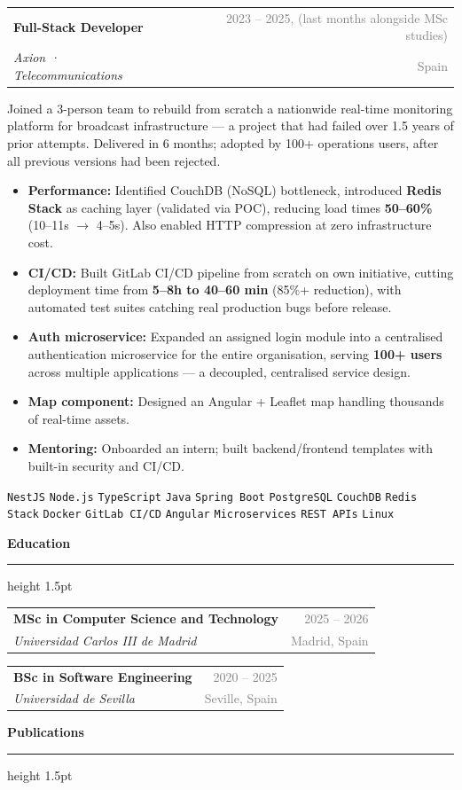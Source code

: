 \documentclass[9.5pt, a4paper]{article}
\newcommand{\cvsection}[1]{%
    \vspace{0.2cm}
    {\large \textbf{\textcolor{primary}{#1}}}
    \vspace{0.05cm}
    \textcolor{accent}{\hrule height 1.5pt}
    \vspace{0.1cm}
}
\newcommand{\cventry}[4]{%
    \noindent
    \begin{tabularx}{\textwidth}{Xr}
        \textbf{\textcolor{primary}{#1}} & \textcolor{gray}{\small #2} \\
        \textit{\textcolor{accent}{#3}} & \textcolor{gray}{\small #4}
    \end{tabularx}
    \vspace{0.1cm}
}
\newcommand{\tag}[1]{%
    \colorbox{tagbg}{\textcolor{accent}{\small\texttt{#1}}}%
}
\begin{document}
\cventry{Full-Stack Developer}{2023 -- 2025, (last months alongside MSc studies)}{Axion · Telecommunications}{Spain}

\noindent Joined a 3-person team to rebuild from scratch a nationwide real-time monitoring platform for broadcast infrastructure — a project that had failed over 1.5 years of prior attempts. Delivered in 6 months; adopted by 100+ operations users, after all previous versions had been rejected.

\begin{itemize}[leftmargin=1.2em, itemsep=1pt, topsep=3pt]
    \item \textbf{Performance:} Identified CouchDB (NoSQL) bottleneck, introduced \textbf{Redis Stack} as caching layer (validated via POC), reducing load times \textbf{50--60\%} (10--11s $\rightarrow$ 4--5s). Also enabled HTTP compression at zero infrastructure cost.
    \item \textbf{CI/CD:} Built GitLab CI/CD pipeline from scratch on own initiative, cutting deployment time from \textbf{5--8h to 40--60 min} (85\%+ reduction), with automated test suites catching real production bugs before release.
    \item \textbf{Auth microservice:} Expanded an assigned login module into a centralised authentication microservice for the entire organisation, serving \textbf{100+ users} across multiple applications — a decoupled, centralised service design.
    \item \textbf{Map component:} Designed an Angular + Leaflet map handling thousands of real-time assets.
    \item \textbf{Mentoring:} Onboarded an intern; built backend/frontend templates with built-in security and CI/CD.
\end{itemize}

\vspace{0.1cm}
\noindent \tag{NestJS} \tag{Node.js} \tag{TypeScript} \tag{Java} \tag{Spring Boot} \tag{PostgreSQL} \tag{CouchDB} \tag{Redis Stack} \tag{Docker} \tag{GitLab CI/CD} \tag{Angular} \tag{Microservices} \tag{REST APIs} \tag{Linux}

\cvsection{Education}
\cventry{MSc in Computer Science and Technology}{2025 -- 2026}{Universidad Carlos III de Madrid}{Madrid, Spain}
\vspace{0.15cm}
\cventry{BSc in Software Engineering}{2020 -- 2025}{Universidad de Sevilla}{Seville, Spain}

\cvsection{Publications}
\end{document}
